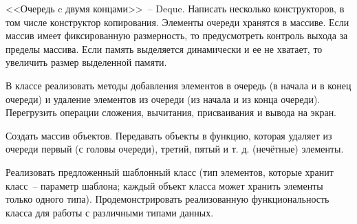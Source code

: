 
<<Очередь c двумя концами>>~-- Deque. Написать несколько конструкторов, в том числе
конструктор копирования. Элементы очереди хранятся в массиве. Если массив имеет
фиксированную размерность, то предусмотреть контроль выхода за пределы массива. Если
память выделяется динамически и ее не хватает, то увеличить размер выделенной памяти.

В классе реализовать методы добавления элементов в очередь (в начала и в конец очереди)
и удаление элементов из очереди (из начала и из конца очереди). Перегрузить операции
сложения, вычитания, присваивания и вывода на экран.

Создать массив объектов.
Передавать объекты в функцию, которая удаляет из очереди первый (с головы очереди),
третий, пятый и т. д. (нечётные) элементы.

Реализовать предложенный шаблонный класс (тип элементов, которые
хранит класс~-- параметр шаблона; каждый объект класса может хранить
элементы только одного типа). Продемонстрировать реализованную
функциональность класса для работы с различными типами данных.
